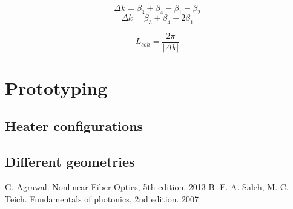 \documentclass[12pt,a4paper,twocolumn,twoside]{article}
\begin{document}
$$\Delta k = \beta_3 + \beta_4 - \beta_1 - \beta_2$$
$$\Delta k = \beta_3 + \beta_4 - 2\beta_1$$

$$L_{coh} = \frac{2\pi}{|\Delta k|}$$



\section{Prototyping}
\subsection{Heater configurations}
\subsection{Different geometries}

\newpage
\begin{thebibliography}{9}
 G. Agrawal. Nonlinear Fiber Optics, 5th edition. 2013
 B. E. A. Saleh, M. C. Teich. Fundamentals of photonics, 2nd edition. 2007
\end{thebibliography}
\end{document}
